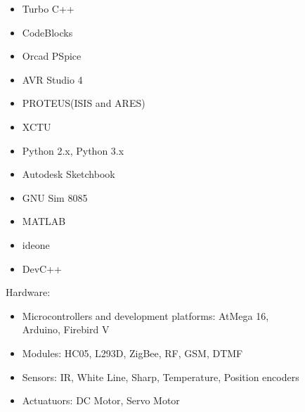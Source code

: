 \documentclass[11pt]{article}
\begin{document}
\begin{figure}[ht]
\begin{minipage}[b]{0.45\linewidth}
\begin{small}
\begin{enumerate}
\begin{itemize}
\item  Turbo C++
\item CodeBlocks
\item  Orcad PSpice
\item AVR Studio 4
\item PROTEUS(ISIS and ARES)
\item XCTU
\item Python 2.x, Python 3.x
\item Autodesk Sketchbook
\item GNU Sim 8085
\item MATLAB
\item  ideone
\item  DevC++
\end{itemize}
\noindent\colorbox{FaintOrange}
{\parbox{\dimexpr\textwidth-2\fboxsep\relax}
{
\item  Hardware:
}}
\begin{itemize}
\item Microcontrollers and development platforms: AtMega 16, Arduino, Firebird V
\item Modules: HC05, L293D, ZigBee, RF, GSM, DTMF
\item Sensors: IR, White Line, Sharp, Temperature, Position encoders
\item Actuatuors: DC Motor, Servo Motor
\vspace{2.5mm}
\end{itemize}


\end{enumerate}
\end{small}
\end{minipage}
\end{figure}
\end{document}
